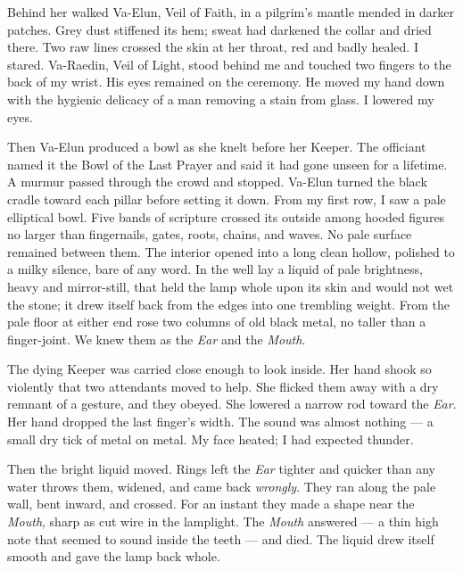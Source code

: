 Behind her walked Va-Elun, Veil of Faith, in a pilgrim's mantle mended in darker patches. Grey dust stiffened its hem; sweat had darkened the collar and dried there. Two raw lines crossed the skin at her throat, red and badly healed. I stared. Va-Raedin, Veil of Light, stood behind me and touched two fingers to the back of my wrist. His eyes remained on the ceremony. He moved my hand down with the hygienic delicacy of a man removing a stain from glass. I lowered my eyes.\par

Then Va-Elun produced a bowl as she knelt before her Keeper. The officiant named it the Bowl of the Last Prayer and said it had gone unseen for a lifetime. A murmur passed through the crowd and stopped. Va-Elun turned the black cradle toward each pillar before setting it down. From my first row, I saw a pale elliptical bowl. Five bands of scripture crossed its outside among hooded figures no larger than fingernails, gates, roots, chains, and waves. No pale surface remained between them. The interior opened into a long clean hollow, polished to a milky silence, bare of any word. In the well lay a liquid of pale brightness, heavy and mirror-still, that held the lamp whole upon its skin and would not wet the stone; it drew itself back from the edges into one trembling weight. From the pale floor at either end rose two columns of old black metal, no taller than a finger-joint. We knew them as the \textit{Ear} and the \textit{Mouth}.\par

The dying Keeper was carried close enough to look inside. Her hand shook so violently that two attendants moved to help. She flicked them away with a dry remnant of a gesture, and they obeyed. She lowered a narrow rod toward the \textit{Ear}. Her hand dropped the last finger's width. The sound was almost nothing --- a small dry tick of metal on metal. My face heated; I had expected thunder.\par

Then the bright liquid moved. Rings left the \textit{Ear} tighter and quicker than any water throws them, widened, and came back \textit{wrongly}. They ran along the pale wall, bent inward, and crossed. For an instant they made a shape near the \textit{Mouth}, sharp as cut wire in the lamplight. The \textit{Mouth} answered --- a thin high note that seemed to sound inside the teeth --- and died. The liquid drew itself smooth and gave the lamp back whole.\par

